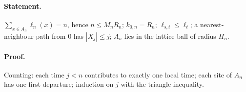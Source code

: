 \paragraph{Statement.} $\sum_{x\in A_n}\ell_n(x)=n$, hence $n\leq M_nR_n$; $k_{0,n}=R_n$; $\ell_{s,t}\leq\ell_t$; a nearest-neighbour path from $0$ has $|X_j|\leq j$; $A_n$ lies in the lattice ball of radius $H_n$.
\paragraph{Proof.} Counting: each time $j<n$ contributes to exactly one local time; each site of $A_n$ has one first departure; induction on $j$ with the triangle inequality.
